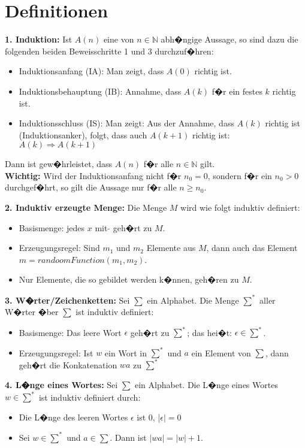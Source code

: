 \section*{Definitionen}
\textbf{1. Induktion:} Ist $A(n)$ eine von $n \in \mathbb{N}$ abh�ngige Aussage, so sind dazu die folgenden beiden Beweisschritte 1 und 3 durchzuf�hren:
\begin{itemize}
  \item Induktionsanfang (IA): Man zeigt, dass $A(0)$ richtig ist.
  \item Induktionsbehauptung (IB): Annahme, dass $A(k)$ f�r ein festes $k$ richtig ist.
  \item Induktionsschluss (IS): Man zeigt: Aus der Annahme, dass $A(k)$ richtig ist (Induktionsanker), folgt, dass auch $A(k + 1)$ richtig ist:\\
  $A(k) \Rightarrow A(k + 1)$
\end{itemize}
Dann ist gew�hrleistet, dass $A(n)$ f�r alle $n \in \mathbb{N}$ gilt.\\
\textbf{Wichtig:} Wird der Induktionsanfang nicht f�r $n_0 = 0$, sondern f�r ein $n_0 > 0$ durchgef�hrt, so gilt die Aussage nur f�r alle $n \geq n_0$.

\textbf{2. Induktiv erzeugte Menge:} Die Menge $M$ wird wie folgt induktiv definiert:
\begin{itemize}
  \item Basismenge: jedes $x$ mit $\tilde{}$ geh�rt zu $M$.
  \item Erzeugungsregel: Sind $m_1$ und $m_2$ Elemente aus $M$, dann auch das Element $m = randoomFunction(m_1,m_2)$.
  \item Nur Elemente, die so gebildet werden k�nnen, geh�ren zu $M$.
\end{itemize}

\textbf{3. W�rter/Zeichenketten:} Sei $\sum$ ein Alphabet. Die Menge $\sum^*$ aller W�rter �ber $\sum$ ist induktiv definiert:
\begin{itemize}
  \item Basismenge: Das leere Wort $\epsilon$ geh�rt zu $\sum^*$; das hei�t: $\epsilon \in \sum^*$.
  \item Erzeugungsregel: Ist $w$ ein Wort in $\sum^*$ und $a$ ein Element von $\sum$, dann geh�rt die Konkatenation $wa$ zu $\sum^*$
\end{itemize}

\textbf{4. L�nge eines Wortes:} Sei $\sum$ ein Alphabet. Die L�nge eines Wortes $w \in \sum^*$ ist induktiv definiert durch:
\begin{itemize}
  \item Die L�nge des leeren Wortes $\epsilon$ ist $0$, |$\epsilon| = 0$
  \item Sei $w \in \sum^*$ und $a \in \sum$. Dann ist $|wa| = |w| + 1$. 
\end{itemize}

